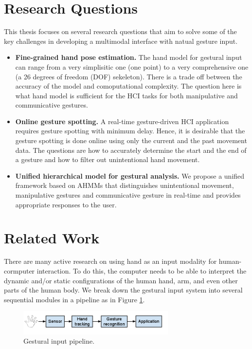 \section{Research Questions}
This thesis focuses on several research questions that aim to solve some of the
key challenges in developing a multimodal interface with natual gesture input.

\begin{itemize}
  \item \textbf{Fine-grained hand pose estimation.} The hand model for
  gestural input can range from a very simplisitic one (one point) to a very
  comprehensive one (a 26 degrees of freedom (DOF) sekeleton). There is a trade
  off between the accuracy of the model and comoputational complexity. The question
  here is what hand model is sufficient for the HCI tasks for both manipulative
  and communicative gestures.
  \item \textbf{Online gesture spotting.} A real-time gesture-driven HCI
  application requires gesture spotting with minimum delay. Hence, it is
  desirable that the gesture spotting is done online using only the current and
  the past movement data. The questions are how to accurately determine the
  start and the end of a gesture and how to filter out unintentional hand
  movement.
  \item \textbf{Unified hierarchical model for gestural analysis.} We propose a
  unified framework based on AHMMs that distinguishes unintentional movement,
  manipulative gestures and communicative gesture in real-time and provides
  appropriate responses to the user.
\end{itemize}

\section{Related Work}
There are many active research on using hand as an input modality for
human-cormputer interaction. To do this, the computer needs to be able to
interpret the dynamic and/or static configurations of the human hand, arm, and
even other parts of the human body. We break down the gestural input
system into several sequential modules in a pipeline as in Figure
\ref{fig:pipeline}.

\begin{figure}[h]
  \centering
  \includegraphics[width=0.7\textwidth]{figures/pipeline.png} 
  \caption{Gestural input pipeline.}
  \label{fig:pipeline}
\end{figure}

